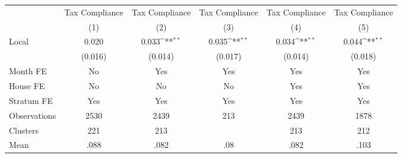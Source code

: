 {
\def\sym#1{\ifmmode^{#1}\else\(^{#1}\)\fi}
\begin{tabular}{l*{5}{c}}
\toprule
                &\multicolumn{1}{c}{Tax Compliance}&\multicolumn{1}{c}{Tax Compliance}&\multicolumn{1}{c}{Tax Compliance}&\multicolumn{1}{c}{Tax Compliance}&\multicolumn{1}{c}{Tax Compliance}\\
                &\multicolumn{1}{c}{(1)}         &\multicolumn{1}{c}{(2)}         &\multicolumn{1}{c}{(3)}         &\multicolumn{1}{c}{(4)}         &\multicolumn{1}{c}{(5)}         \\
\midrule
Local           &    0.020         &    0.033\sym{**} &    0.035\sym{**} &    0.034\sym{**} &    0.044\sym{**} \\
                &  (0.016)         &  (0.014)         &  (0.017)         &  (0.014)         &  (0.018)         \\
Month FE        &       No         &      Yes         &      Yes         &      Yes         &      Yes         \\
House FE        &       No         &       No         &       No         &      Yes         &      Yes         \\
Stratum FE      &      Yes         &      Yes         &      Yes         &      Yes         &      Yes         \\
\midrule
Observations    &     2530         &     2439         &      213         &     2439         &     1878         \\
Clusters        &      221         &      213         &                  &      213         &      212         \\
Mean            &     .088         &     .082         &      .08         &     .082         &     .103         \\
\bottomrule
\end{tabular}
}
